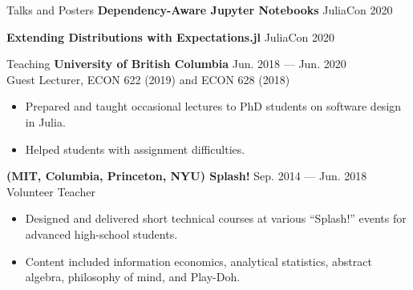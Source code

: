 \documentclass{resume} %
\begin{document}
\begin{rSection}{Talks and Posters}
    {\bf Dependency-Aware Jupyter Notebooks} \hfill {JuliaCon 2020}

    {\bf Extending Distributions with Expectations.jl} \hfill {JuliaCon 2020}
\end{rSection}

\begin{rSection}{Teaching}
    {\bf University of British Columbia} \hfill {Jun. 2018 --- Jun. 2020}
    \\ Guest Lecturer, ECON 622 (2019) and ECON 628 (2018)
    \begin{itemize}
        \item Prepared and taught occasional lectures to PhD students on software design in Julia.
        \item Helped students with assignment difficulties.
    \end{itemize}

    {\bf (MIT, Columbia, Princeton, NYU) Splash!} \hfill {Sep. 2014 --- Jun. 2018}
    \\ Volunteer Teacher
    \begin{itemize}
        \item Designed and delivered short technical courses at various ``Splash!'' events for advanced high-school students.
        \item Content included information economics, analytical statistics, abstract algebra, philosophy of mind, and Play-Doh.
    \end{itemize}

\end{rSection}
\end{document}
